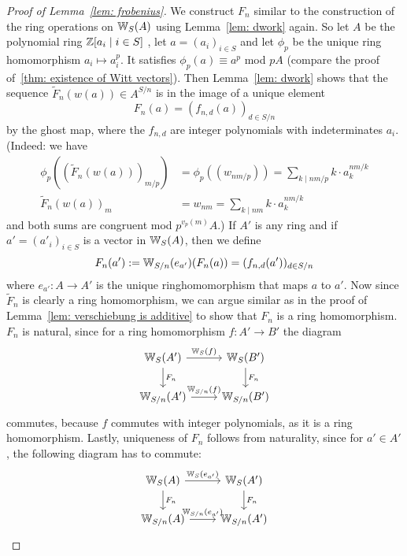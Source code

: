 \begin{proof}[Proof of Lemma~\ref*{lem: frobenius}]
    We construct $F_n$ similar to the construction of the ring operations on $\mathbb{W}_S(A)$ 
    using Lemma~\ref{lem: dwork} again. So let $A$ be the polynomial ring $\mathbb{Z}[a_i\mid i \in S]$
    , let $a = (a_i)_{i \in S}$ and let $\phi_p$ be the unique ring homomorphism
    $a_i \mapsto a_i^p$. It satisfies $\phi_p(a) \equiv a^p$ mod $pA$ 
    (compare the proof of~\ref{thm: existence of Witt vectors}). Then Lemma~\ref{lem: dwork} shows that the sequence
    $\widetilde{F}_n(w(a)) \in A^{S/n}$ is in the image of a unique element
    \[
      F_n(a)  =(f_{n,d}(a))_{d \in S/n}
    \]
    by the ghost map, where the $f_{n,d}$ are integer polynomials with indeterminates
    $a_i$. (Indeed: we have 
    \begin{align*}
        \phi_{p}((\widetilde{F}_n(w(a)))_{m/p}) &= \phi_{p}((w_{nm/p})) 
        = \sum_{k \mid nm/p} k \cdot a_k^{nm/k} \\
        \widetilde{F}_n(w(a))_m
        &= w_{nm}
        = \sum_{k \mid nm} k \cdot a_k^{nm/k}
    \end{align*}
    and both sums are congruent mod $p^{v_p(m)}A$.)
    If $A'$ is any ring and if $a' = (a'_i)_{i \in S}$ is a vector in $\mathbb{W}_S(A)$,
    then we define
    \[
      F_n(a') := \mathbb{W}_{S/n}(e_{a'})(F_n(a)) = (f_{n,d}(a'))_{d \in S/n}
    \]
    where $e_{a'} \colon A \to A'$ is the unique ringhomomorphism that maps $a$ to $a'$.
    Now since $\widetilde{F}_n$ is clearly a ring homomorphism,
    we can argue similar as in the proof of Lemma~\ref{lem: verschiebung is additive}
    to show that $F_n$ is a ring homomorphism. $F_n$ is natural, since for a ring homomorphism
    $f \colon A' \to B'$ the diagram
    \[
       \begin{tikzcd}
           \W_S(A') \arrow[r,"\W_S(f)"] \arrow[d,"F_n"] 
             & \W_S(B') \arrow[d,"F_n"] \\
           \W_{S/n}(A') \arrow[r,"\W_{S/n}(f)"]
             & \W_{S/n}(B')
       \end{tikzcd} 
    \]
    commutes, because $f$ commutes with integer polynomials, as it is a ring homomorphism.
    Lastly, uniqueness of $F_n$ follows from naturality, since for $a' \in A'$, the following diagram has to 
    commute:
    \[
        \begin{tikzcd}
            \W_S(A) \arrow[r,"\W_S(e_{a'})"] \arrow[d,"F_n"] 
              & \W_S(A') \arrow[d,"F_n"] \\
            \W_{S/n}(A) \arrow[r,"\W_{S/n}(e_{a'})"]
              & \W_{S/n}(A')
        \end{tikzcd} 
     \]
\end{proof}
